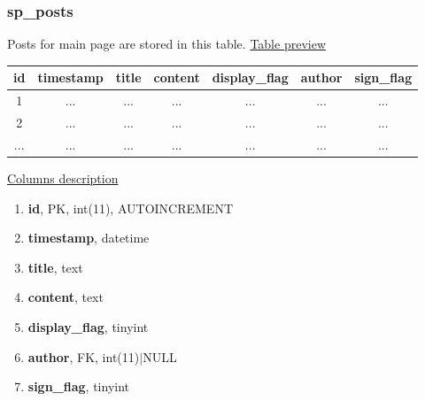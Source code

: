 \subsubsection*{sp\_posts}
Posts for main page are stored in this table.
\newline
\underline{Table preview}
\begin{center}
  \begin{tabular}{||c c c c c c c||} 
  \hline
  id & timestamp & title & content & display\_flag & author & sign\_flag  \\ [0.5ex] 
  \hline\hline
  1 & ... & ... & ... & ... & ... & ... \\ 
  \hline
  2 & ... & ... & ... & ... & ... & ... \\ 
 \hline
  ... & ... & ... & ... & ... & ...  & ... \\ [1ex] 
  \hline
  \end{tabular}
\end{center}
\underline{Columns description}
\begin{enumerate}
  \setlength\itemsep{0em}
  \item \textbf{id}, PK, int(11), AUTOINCREMENT
  \item \textbf{timestamp}, datetime
  \item \textbf{title}, text
  \item \textbf{content}, text
  \item \textbf{display\_flag}, tinyint
  \item \textbf{author}, FK, int(11)$|$NULL
  \item \textbf{sign\_flag}, tinyint
\end{enumerate}

